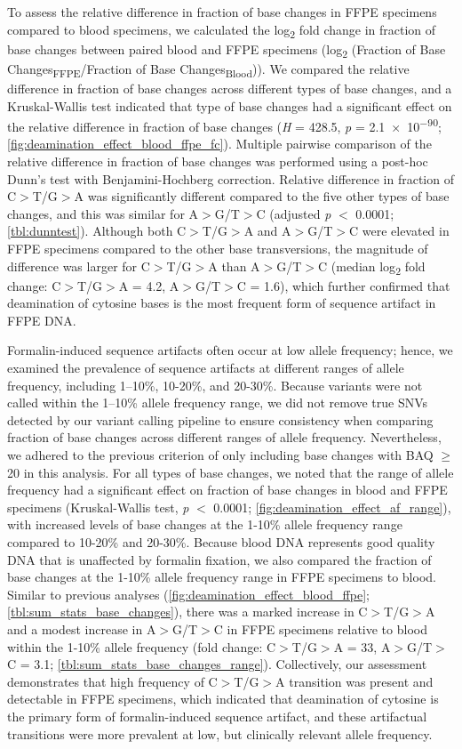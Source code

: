 To assess the relative difference in fraction of base changes in FFPE specimens compared to blood specimens, we calculated the log\textsubscript{2} fold change in fraction of base changes between paired blood and FFPE specimens (log\textsubscript{2} (Fraction of Base Changes\textsubscript{FFPE}/Fraction of Base Changes\textsubscript{Blood})). We compared the relative difference in fraction of base changes across different types of base changes, and a Kruskal-Wallis test indicated that type of base changes had a significant effect on the relative difference in fraction of base changes (\textit{H} = 428.5, \textit{p} = \num{2.1e-90}; \autoref{fig:deamination_effect_blood_ffpe_fc}). Multiple pairwise comparison of the relative difference in fraction of base changes was performed using a post-hoc Dunn's test with Benjamini-Hochberg correction. Relative difference in fraction of C$>$T/G$>$A was significantly different compared to the five other types of base changes, and this was similar for A$>$G/T$>$C (adjusted \textit{p} $<$ 0.0001; \autoref{tbl:dunntest}). Although both C$>$T/G$>$A and A$>$G/T$>$C were elevated in FFPE specimens compared to the other base transversions, the magnitude of difference was larger for C$>$T/G$>$A than A$>$G/T$>$C (median log\textsubscript{2} fold change: C$>$T/G$>$A = 4.2, A$>$G/T$>$C = 1.6), which further confirmed that deamination of cytosine bases is the most frequent form of sequence artifact in FFPE DNA.

Formalin-induced sequence artifacts often occur at low allele frequency; hence, we examined the prevalence of sequence artifacts at different ranges of allele frequency, including 1--10\%, 10-20\%, and 20-30\%. Because variants were not called within the 1--10\% allele frequency range, we did not remove true SNVs detected by our variant calling pipeline to ensure consistency when comparing fraction of base changes across different ranges of allele frequency. Nevertheless, we adhered to the previous criterion of only including base changes with BAQ $\geq$ 20 in this analysis. For all types of base changes, we noted that the range of allele frequency had a significant effect on fraction of base changes in blood and FFPE specimens (Kruskal-Wallis test, \textit{p} $<$ 0.0001; \autoref{fig:deamination_effect_af_range}), with increased levels of base changes at the 1-10\% allele frequency range compared to 10-20\% and 20-30\%. Because blood DNA represents good quality DNA that is unaffected by formalin fixation, we also compared the fraction of base changes at the 1-10\% allele frequency range in FFPE specimens to blood. Similar to previous analyses (\autoref{fig:deamination_effect_blood_ffpe}; \autoref{tbl:sum_stats_base_changes}), there was a marked increase in C$>$T/G$>$A and a modest increase in A$>$G/T$>$C in FFPE specimens relative to blood within the 1-10\% allele frequency (fold change: C$>$T/G$>$A = 33, A$>$G/T$>$C = 3.1; \autoref{tbl:sum_stats_base_changes_range}). Collectively, our assessment demonstrates that high frequency of C$>$T/G$>$A transition was present and detectable in FFPE specimens, which indicated that deamination of cytosine is the primary form of formalin-induced sequence artifact, and these artifactual transitions were more prevalent at low, but clinically relevant allele frequency.

